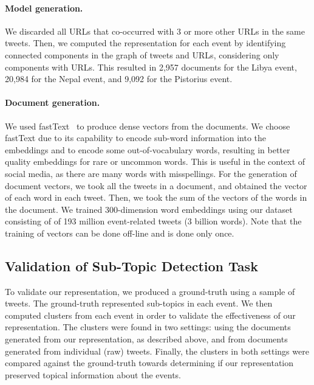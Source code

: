 
\paragraph{Model generation.} 
%
We discarded all URLs that co-occurred with 3 or more other URLs in the same
tweets. 
%
Then, we computed the representation for each event by identifying connected
components in the graph of tweets and URLs, considering only components with
URLs.
%
This resulted in 2,957 documents for the Libya event, 20,984 for the Nepal
event, and 9,092 for the Pistorius event.


\paragraph{Document generation.}
%
We used fastText~\cite{bojanowski2016enriching} to produce dense vectors from
the documents.
%
We choose fastText due to its capability to encode sub-word information into the
embeddings and to encode some out-of-vocabulary words, resulting in better
quality embeddings for rare or uncommon words. 
%
This is useful in the context of social media, as there are many words with
misspellings. 
%
For the generation of document vectors, we took all the tweets in a document,
and obtained the vector of each word in each tweet.
%
Then, we took the sum of the vectors of the words in the document.
%
We trained 300-dimension word embeddings using our dataset consisting of of 193
million event-related tweets (3 billion words).
%
Note that the training of vectors can be done off-line and is done only once.


\subsection{Validation of Sub-Topic Detection Task}

To validate our representation, we produced a ground-truth using a sample of
tweets.
%
The ground-truth represented sub-topics in each event. 
%
We then computed clusters from each event in order to validate the effectiveness
of our representation.
%
The clusters were found in two settings: using the documents generated from our
representation, as described above, and from documents generated from individual
(raw) tweets.
%
Finally, the clusters in both settings were compared against the ground-truth
towards determining if our representation preserved topical information about
the events.

